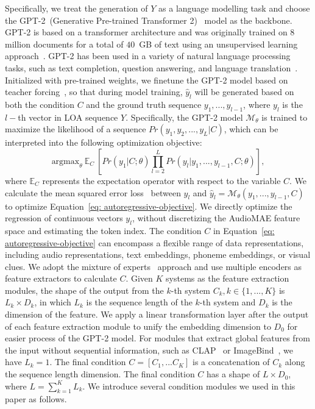 \documentclass[lettersize,journal]{IEEEtran}
\begin{document}
Specifically, we treat the generation of $Y$ as a language modelling task and choose the GPT-2~(Generative Pre-trained Transformer 2)~\cite{radford2019language} model as the backbone. GPT-2 is based on a transformer architecture and was originally trained on $8$ million documents for a total of $40$~GB of text using an unsupervised learning approach~\cite{radford2019language}. 
GPT-2 has been used in a variety of natural language processing tasks, such as text completion, question answering, and language translation~\cite{qu2020text,klein2019learning}. 
Initialized with pre-trained weights, we finetune the GPT-2 model based on teacher forcing~\cite{lamb2016professor}, so that during model training, $\hat{y}_{l}$ will be generated based on both the condition $C$ and the ground truth sequence $y_{1},...,y_{l-1}$, where $y_l$ is the $l-$th vector in LOA sequence $Y$. Specifically, the GPT-2 model $\mathcal{M}_{\theta}$ is trained to maximize the likelihood of a sequence $Pr(y_1,y_2,...,y_{L}|C)$, which can be interpreted into the following optimization objective:
\begin{equation}
    \label{eq: autoregressive-objective}
    \text{argmax}_{\theta}~\mathbb{E}_{C}~[Pr(y_1|C; \theta)\prod_{l=2}^{L}Pr(y_{l}|y_1,...,y_{l-1}, C; \theta)],
\end{equation}
where $\mathbb{E}_{C}$ represents the expectation operator with respect to the variable $C$.
We calculate the mean squared error loss~\cite{oord2016wavenet} between $y_{l}$ and $\hat{y}_{l}=\mathcal{M}_{\theta}(y_1,...,y_{l-1}, C)$ to optimize Equation~\eqref{eq: autoregressive-objective}. We directly optimize the regression of continuous vectors $y_{l}$, without discretizing the AudioMAE feature space and estimating the token index. 
The condition $C$ in Equation~\eqref{eq: autoregressive-objective} can encompass a flexible range of data representations, including audio representations, text embeddings, phoneme embeddings, or visual clues. We adopt the mixture of experts~\cite{masoudnia2014mixture} approach and use multiple encoders as feature extractors to calculate $C$. Given $K$ systems as the feature extraction modules, the shape of the output from the $k$-th system $C_{k}, k\in\{1,...,K\}$ is $L_{k}\times D_k$, in which $L_{k}$ is the sequence length of the $k$-th system and $D_k$ is the dimension of the feature. We apply a linear transformation layer after the output of each feature extraction module to unify the embedding dimension to $D_0$ for easier process of the GPT-2 model. For modules that extract global features from the input without sequential information, such as CLAP~\cite{wu2023large-clap} or ImageBind~\cite{girdhar2023imagebind}, we have $L_{k}=1$. The final condition $C=[C_{1},...C_{K}]$ is a concatenation of $C_{k}$ along the sequence length dimension. The final condition $C$ has a shape of $L\times D_0$, where $L=\sum_{k=1}^{K}L_{k}$. We introduce several condition modules we used in this paper as follows.  
\end{document}
